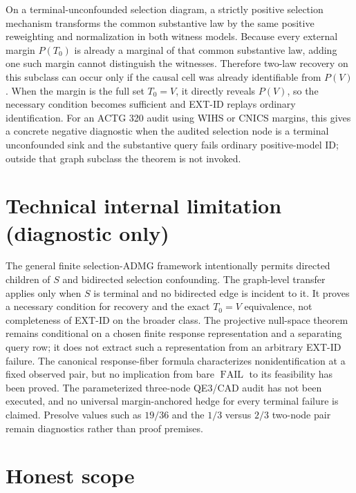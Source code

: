 \documentclass{article}
\begin{document}
On a terminal-unconfounded selection diagram, a strictly positive selection mechanism transforms the common substantive law by the same positive reweighting and normalization in both witness models. Because every external margin \(P(T_0)\) is already a marginal of that common substantive law, adding one such margin cannot distinguish the witnesses. Therefore two-law recovery on this subclass can occur only if the causal cell was already identifiable from \(P(V)\). When the margin is the full set \(T_0=V\), it directly reveals \(P(V)\), so the necessary condition becomes sufficient and EXT-ID replays ordinary identification. For an ACTG 320 audit using WIHS or CNICS margins, this gives a concrete negative diagnostic when the audited selection node is a terminal unconfounded sink and the substantive query fails ordinary positive-model ID; outside that graph subclass the theorem is not invoked.

\section*{Technical internal limitation (diagnostic only)}

The general finite selection-ADMG framework intentionally permits directed children of \(S\) and bidirected selection confounding. The graph-level transfer applies only when \(S\) is terminal and no bidirected edge is incident to it. It proves a necessary condition for recovery and the exact \(T_0=V\) equivalence, not completeness of EXT-ID on the broader class. The projective null-space theorem remains conditional on a chosen finite response representation and a separating query row; it does not extract such a representation from an arbitrary EXT-ID failure. The canonical response-fiber formula characterizes nonidentification at a fixed observed pair, but no implication from bare \(\operatorname{FAIL}\) to its feasibility has been proved. The parameterized three-node QE3/CAD audit has not been executed, and no universal margin-anchored hedge for every terminal failure is claimed. Presolve values such as \(19/36\) and the \(1/3\) versus \(2/3\) two-node pair remain diagnostics rather than proof premises.

\section{Honest scope}
\end{document}

